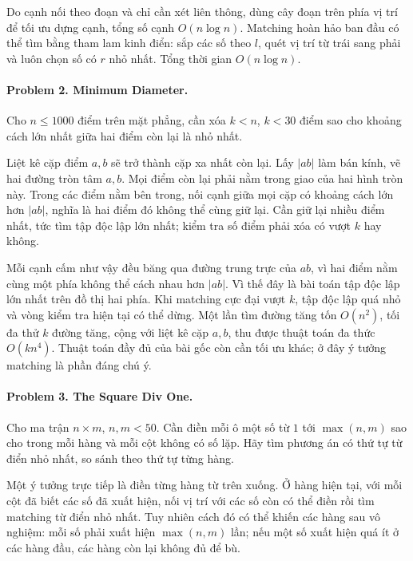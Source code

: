 \documentclass[11pt]{article}
\begin{document}
Do cạnh nối theo đoạn và chỉ cần xét liên thông, dùng cây đoạn trên phía vị trí
để tối ưu dựng cạnh, tổng số cạnh \(O(n\log n)\). Matching hoàn hảo ban đầu có
thể tìm bằng tham lam kinh điển: sắp các số theo \(l\), quét vị trí từ trái sang
phải và luôn chọn số có \(r\) nhỏ nhất. Tổng thời gian \(O(n\log n)\).

\paragraph{Problem 2. Minimum Diameter.}
Cho \(n\le 1000\) điểm trên mặt phẳng, cần xóa \(k<n\), \(k<30\) điểm sao cho
khoảng cách lớn nhất giữa hai điểm còn lại là nhỏ nhất.

Liệt kê cặp điểm \(a,b\) sẽ trở thành cặp xa nhất còn lại. Lấy \(|ab|\) làm bán
kính, vẽ hai đường tròn tâm \(a,b\). Mọi điểm còn lại phải nằm trong giao của
hai hình tròn này. Trong các điểm nằm bên trong, nối cạnh giữa mọi cặp có khoảng
cách lớn hơn \(|ab|\), nghĩa là hai điểm đó không thể cùng giữ lại. Cần giữ lại
nhiều điểm nhất, tức tìm tập độc lập lớn nhất; kiểm tra số điểm phải xóa có
vượt \(k\) hay không.

Mỗi cạnh cấm như vậy đều băng qua đường trung trực của \(ab\), vì hai điểm nằm
cùng một phía không thể cách nhau hơn \(|ab|\). Vì thế đây là bài toán tập độc
lập lớn nhất trên đồ thị hai phía. Khi matching cực đại vượt \(k\), tập độc lập
quá nhỏ và vòng kiểm tra hiện tại có thể dừng. Một lần tìm đường tăng tốn
\(O(n^2)\), tối đa thử \(k\) đường tăng, cộng với liệt kê cặp \(a,b\), thu được
thuật toán đa thức \(O(kn^4)\). Thuật toán đầy đủ của bài gốc còn cần tối ưu
khác; ở đây ý tưởng matching là phần đáng chú ý.

\paragraph{Problem 3. The Square Div One.}
Cho ma trận \(n\times m\), \(n,m<50\). Cần điền mỗi ô một số từ
\(1\) tới \(\max(n,m)\) sao cho trong mỗi hàng và mỗi cột không có số lặp. Hãy
tìm phương án có thứ tự từ điển nhỏ nhất, so sánh theo thứ tự từng hàng.

Một ý tưởng trực tiếp là điền từng hàng từ trên xuống. Ở hàng hiện tại, với mỗi
cột đã biết các số đã xuất hiện, nối vị trí với các số còn có thể điền rồi tìm
matching từ điển nhỏ nhất. Tuy nhiên cách đó có thể khiến các hàng sau vô nghiệm:
mỗi số phải xuất hiện \(\max(n,m)\) lần; nếu một số xuất hiện quá ít ở các hàng
đầu, các hàng còn lại không đủ để bù.
\end{document}
